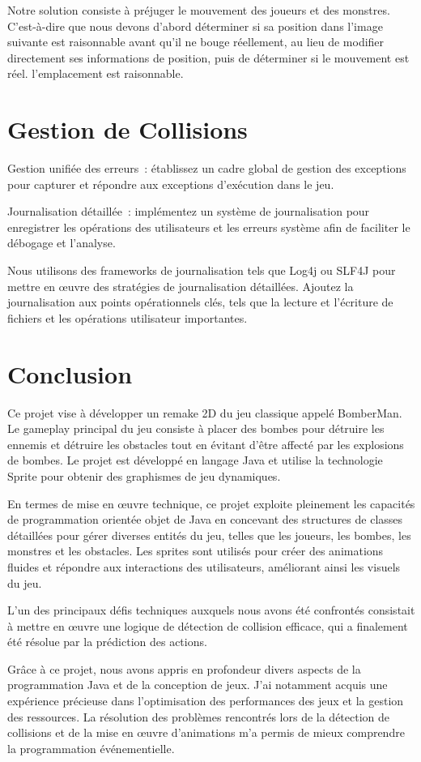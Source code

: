 \documentclass[11pt,english]{article}
\begin{document}
\indent Notre solution consiste à préjuger le mouvement des joueurs et des monstres. C'est-à-dire que nous devons d'abord déterminer si sa position dans l'image suivante est raisonnable avant qu'il ne bouge réellement, au lieu de modifier directement ses informations de position, puis de déterminer si le mouvement est réel. l'emplacement est raisonnable.

\section{Gestion de Collisions}

\indent 

Gestion unifiée des erreurs : établissez un cadre global de gestion des exceptions pour capturer et répondre aux exceptions d'exécution dans le jeu.

\indent Journalisation détaillée : implémentez un système de journalisation pour enregistrer les opérations des utilisateurs et les erreurs système afin de faciliter le débogage et l'analyse.

\indent Nous utilisons des frameworks de journalisation tels que Log4j ou SLF4J pour mettre en œuvre des stratégies de journalisation détaillées. Ajoutez la journalisation aux points opérationnels clés, tels que la lecture et l’écriture de fichiers et les opérations utilisateur importantes.

\section{Conclusion}

\indent

Ce projet vise à développer un remake 2D du jeu classique appelé BomberMan. Le gameplay principal du jeu consiste à placer des bombes pour détruire les ennemis et détruire les obstacles tout en évitant d'être affecté par les explosions de bombes. Le projet est développé en langage Java et utilise la technologie Sprite pour obtenir des graphismes de jeu dynamiques.

\indent En termes de mise en œuvre technique, ce projet exploite pleinement les capacités de programmation orientée objet de Java en concevant des structures de classes détaillées pour gérer diverses entités du jeu, telles que les joueurs, les bombes, les monstres et les obstacles. Les sprites sont utilisés pour créer des animations fluides et répondre aux interactions des utilisateurs, améliorant ainsi les visuels du jeu.

\indent L’un des principaux défis techniques auxquels nous avons été confrontés consistait à mettre en œuvre une logique de détection de collision efficace, qui a finalement été résolue par la prédiction des actions.

\indent Grâce à ce projet, nous avons appris en profondeur divers aspects de la programmation Java et de la conception de jeux. J'ai notamment acquis une expérience précieuse dans l'optimisation des performances des jeux et la gestion des ressources. La résolution des problèmes rencontrés lors de la détection de collisions et de la mise en œuvre d'animations m'a permis de mieux comprendre la programmation événementielle.
\end{document}
